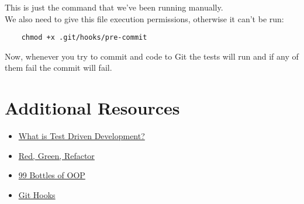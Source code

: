 This is just the command that we've been running manually.
\\

We also need to give this file execution permissions, otherwise it can't be run:

\begin{verbatim}
    chmod +x .git/hooks/pre-commit
\end{verbatim}

Now, whenever you try to commit and code to Git the tests will run and if any of them fail the commit will fail.



\section{Additional Resources}

\begin{itemize}[leftmargin=*]
    \item \href{https://www.freecodecamp.org/news/test-driven-development-what-it-is-and-what-it-is-not-41fa6bca02a2/}{What is Test Driven Development?}
    \item \href{https://www.codecademy.com/articles/tdd-red-green-refactor}{Red, Green, Refactor}
    \item \href{https://www.sandimetz.com/99bottles}{99 Bottles of OOP}
    \item \href{https://git-scm.com/book/en/v2/Customizing-Git-Git-Hooks}{Git Hooks}
\end{itemize}
